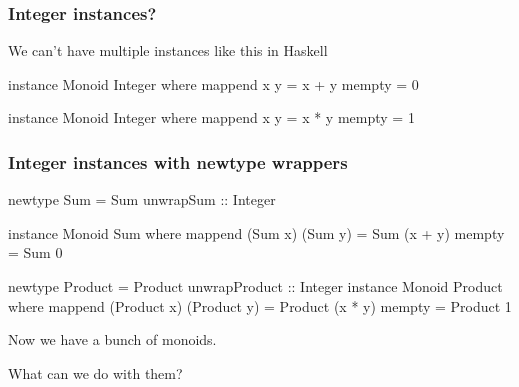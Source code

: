 \documentclass[UKenglish,usenames,dvipsnames,svgnames,table,aspectratio=169,mathserif]{beamer}
\newcommand{\textslide}[1]{{
\begin{frame}
\begin{center}

#1

\end{center}
\end{frame}
}}
\begin{document}
\begin{frame}[fragile]
\frametitle{Integer instances?}
\begin{center}
\begin{minipage}{0.6\textwidth}

We can't have multiple instances like this in Haskell

\begin{haskellcode}
instance Monoid Integer where
  mappend x y = x + y
  mempty = 0

instance Monoid Integer where
  mappend x y = x * y
  mempty = 1
\end{haskellcode}
\end{minipage}
\end{center}
\end{frame}


\begin{frame}[fragile]
\frametitle{Integer instances with newtype wrappers}
\begin{center}
\begin{minipage}{0.6\textwidth}
\begin{haskellcode}
newtype Sum = Sum { unwrapSum :: Integer }
\end{haskellcode}
\pause

\begin{haskellcode}
instance Monoid Sum where
  mappend (Sum x) (Sum y) = Sum (x + y)
  mempty = Sum 0
\end{haskellcode}
\pause
\bigskip

\begin{haskellcode}
newtype Product = Product { unwrapProduct :: Integer }
instance Monoid Product where
  mappend (Product x) (Product y) = Product (x * y)
  mempty = Product 1
\end{haskellcode}
\end{minipage}
\end{center}
\end{frame}


\textslide{Now we have a bunch of monoids.

What can we do with them?}
\end{document}
